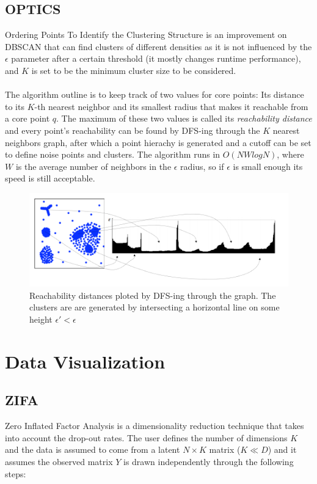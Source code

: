 \documentclass[11pt]{article}
\begin{document}
\subsection{OPTICS}
Ordering Points To Identify the Clustering Structure \cite{optics} is an improvement on DBSCAN that can find clusters of different densities as it is not influenced by the $\epsilon$ parameter after a certain threshold (it mostly changes runtime performance), and $K$ is set to be the minimum cluster size to be considered. \\
\\
The algorithm outline is to keep track of two values for core points: Its distance to its $K$-th nearest neighbor and its smallest radius that makes it reachable from a core point $q$. The maximum of these two values is called its \emph{reachability distance} and every point's reachability can be found by DFS-ing through the $K$ nearest neighbors graph, after which a point hierachy is generated and a cutoff can be set to define noise points and clusters. The algorithm runs in $O(N W logN)$, where $W$ is the average number of neighbors in the $\epsilon$ radius, so if $\epsilon$ is small enough its speed is still acceptable. 
\begin{figure}[h]
\includegraphics[scale=0.5]{OPTICS}
\caption {Reachability distances ploted by DFS-ing through the graph. The clusters are are generated by intersecting a horizontal line on some height $\epsilon' < \epsilon$}
\end{figure}

\section{Data Visualization}
\subsection{ZIFA}
Zero Inflated Factor Analysis \cite{zifa} is a dimensionality reduction technique that takes into account the drop-out rates. The user defines the number of dimensions $K$ and the data is assumed to come from a latent $N \times K$ matrix ($K \ll D$) and it assumes the observed matrix $Y$ is drawn independently through the following steps:
\end{document}
